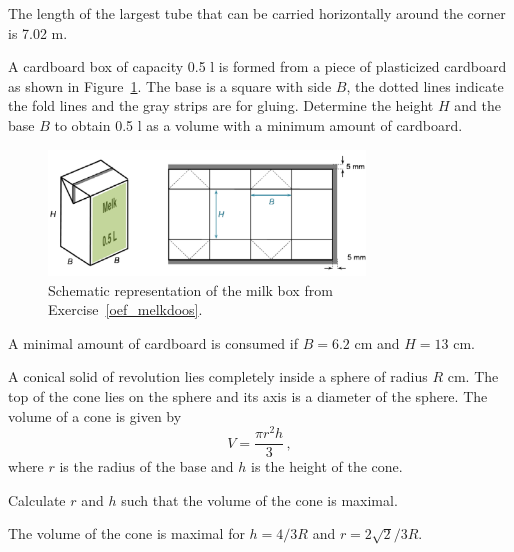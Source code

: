 \begin{Answer}\phantom{}
    The length of the largest tube that can be carried horizontally around the corner is 7.02 m.
\end{Answer}

\begin{Exercise}[difficulty = 2, label = oef_melkdoos] A cardboard box of capacity 0.5 l is formed from a piece of plasticized cardboard as shown in Figure~\ref{fig_behaviour_35}. The base is a square with side $B$, the dotted lines indicate the fold lines and the gray strips are for gluing. Determine the height $H$ and the base $B$ to obtain 0.5 l as a volume with a minimum amount of cardboard. 

\begin{figure}[H]
\centerline{
\includegraphics[width=0.75\textwidth]{figures/Behaviour/fig_behaviour_35}}
\caption{Schematic representation of the milk box from Exercise~\ref{oef_melkdoos}.}
\label{fig_behaviour_35}
\end{figure}

\end{Exercise}

\begin{Answer}\phantom{}
    A minimal amount of cardboard is consumed if $B=6.2$ cm and $H=13$ cm.
\end{Answer}

\begin{Exercise}[difficulty = 3] A conical solid of revolution lies completely inside a sphere of radius $R$ cm. The top of the cone lies on the sphere and its axis is a diameter of the sphere. The volume of a cone is given by
$$
V=\dfrac{\pi r^2h}{3}\,,
$$
where $r$ is the radius of the base and $h$ is the height of the cone.

Calculate $r$ and $h$ such that the volume of the cone is maximal. 

\end{Exercise}

\begin{Answer}\phantom{}
    The volume of the cone is maximal for $h=4/3R$ and $r=2\sqrt{2}/3R$.
\end{Answer}
\fi


